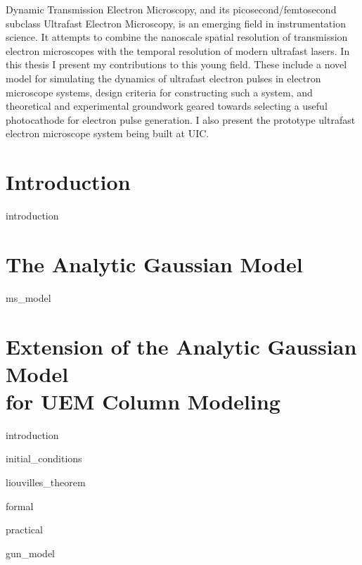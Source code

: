 \documentclass{uicthesi}
\begin{document}
 
 
\tableofcontents
\listoffigures
 

 
\summary
Dynamic Transmission Electron Microscopy, and its picosecond/femtosecond subclass Ultrafast Electron Microscopy, is an emerging field in instrumentation science.
It attempts to combine the nanoscale spatial resolution of transmission electron microscopes with the temporal resolution of modern ultrafast lasers.
In this thesis I present my contributions to this young field. 
These include a novel model for simulating the dynamics of ultrafast electron pulses in electron microscope systems,
design criteria for constructing such a system, and theoretical and experimental groundwork geared towards selecting a useful photocathode for electron pulse generation.
I also present the prototype ultrafast electron microscope system being built at UIC.

\chapter{Introduction}

  {introduction}

\chapter{The Analytic Gaussian Model} \label{chap:ms_model}

  {ms_model}

\chapter{Extension of the Analytic Gaussian Model\\for UEM Column Modeling} \label{chap:extension}

  {introduction}

  {initial_conditions}

  {liouvilles_theorem}

  {formal}

  {practical}

  {gun_model}
\end{document}
